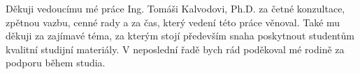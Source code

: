 Děkuji vedoucímu mé práce Ing. Tomáši Kalvodovi, Ph.D. za četné konzultace, zpětnou vazbu, cenné rady a za čas, který
vedení této práce věnoval. Také mu děkuji za zajímavé téma, za kterým stojí především snaha poskytnout studentům
kvalitní studijní materiály. V neposlední řadě bych rád poděkoval mé rodině za podporu během studia.
